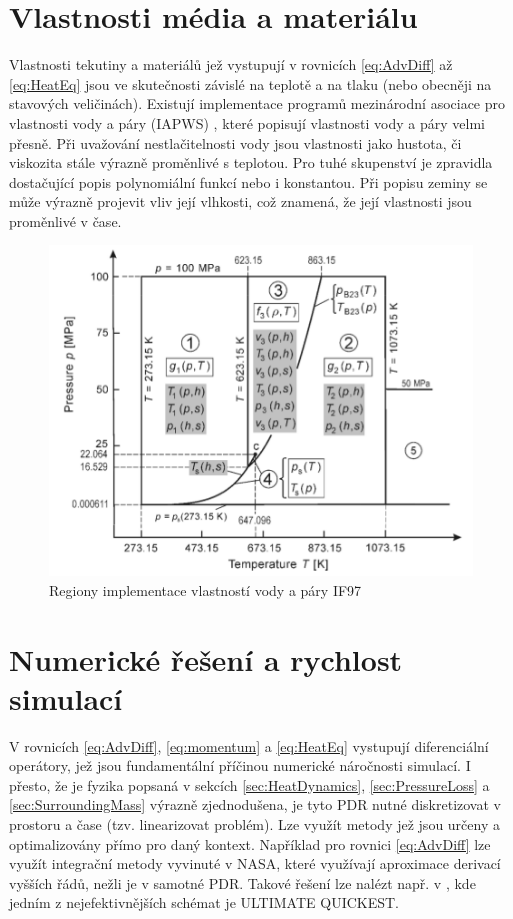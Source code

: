 \section{Vlastnosti média a materiálu}
Vlastnosti tekutiny a materiálů jež vystupují v rovnicích \ref{eq:AdvDiff} až
\ref{eq:HeatEq} jsou ve skutečnosti závislé na teplotě a na tlaku (nebo
obecněji na stavových veličinách). Existují implementace programů mezinárodní
asociace pro vlastnosti vody a páry (IAPWS) \cite{IAPWS2007}, které popisují
vlastnosti vody a páry velmi přesně. Při uvažování nestlačitelnosti vody jsou
vlastnosti jako hustota, či viskozita stále výrazně proměnlivé s teplotou. Pro
tuhé skupenství je zpravidla dostačující popis polynomiální funkcí nebo i
konstantou. Při popisu zeminy se může výrazně projevit vliv její vlhkosti, což
znamená, že její vlastnosti jsou proměnlivé v čase.

\begin{figure}[h] \centering \capstart
  \includegraphics[scale=0.7]{figures/IF97}
  \caption{Regiony implementace vlastností vody a páry IF97 \cite{IAPWS2007}}
  \label{fig:IF97}
\end{figure}

\section{Numerické řešení a rychlost simulací}
\label{sec:NumSpeed}
V rovnicích \ref{eq:AdvDiff}, \ref{eq:momentum} a \ref{eq:HeatEq} vystupují
diferenciální operátory, jež jsou fundamentální příčinou numerické náročnosti
simulací. I přesto, že je fyzika popsaná v sekcích \ref{sec:HeatDynamics},
\ref{sec:PressureLoss} a \ref{sec:SurroundingMass} výrazně zjednodušena, je
tyto PDR nutné diskretizovat v prostoru a čase (tzv. linearizovat problém). Lze
využít metody jež jsou určeny a optimalizovány přímo pro daný kontext.
Například pro rovnici \ref{eq:AdvDiff} lze využít integrační metody vyvinuté v
NASA, které využívají aproximace derivací vyšších řádů, nežli je v samotné PDR.
Takové řešení lze nalézt např. v \cite{leonard1988}, kde jedním z
nejefektivnějších schémat je ULTIMATE QUICKEST.

